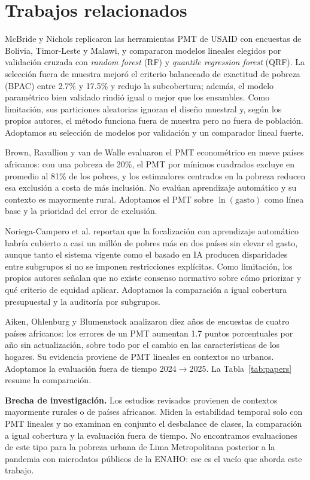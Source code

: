 \section{Trabajos relacionados}

McBride y Nichols \cite{mcbride2018retooling} replicaron las herramientas PMT de USAID con encuestas de Bolivia, Timor-Leste y Malawi, y compararon modelos lineales elegidos por validación cruzada con \textit{random forest} (RF) y \textit{quantile regression forest} (QRF). La selección fuera de muestra mejoró el criterio balanceado de exactitud de pobreza (BPAC) entre 2.7\% y 17.5\% y redujo la subcobertura; además, el modelo paramétrico bien validado rindió igual o mejor que los ensambles. Como limitación, sus particiones aleatorias ignoran el diseño muestral y, según los propios autores, el método funciona fuera de muestra pero no fuera de población. Adoptamos su selección de modelos por validación y un comparador lineal fuerte.

Brown, Ravallion y van de Walle \cite{brown2018poor} evaluaron el PMT econométrico en nueve países africanos: con una pobreza de 20\%, el PMT por mínimos cuadrados excluye en promedio al 81\% de los pobres, y los estimadores centrados en la pobreza reducen esa exclusión a costa de más inclusión. No evalúan aprendizaje automático y su contexto es mayormente rural. Adoptamos el PMT sobre $\ln(\text{gasto})$ como línea base y la prioridad del error de exclusión.

Noriega-Campero et al. \cite{noriega2020algorithmic} reportan que la focalización con aprendizaje automático habría cubierto a casi un millón de pobres más en dos países sin elevar el gasto, aunque tanto el sistema vigente como el basado en IA producen disparidades entre subgrupos si no se imponen restricciones explícitas. Como limitación, los propios autores señalan que no existe consenso normativo sobre cómo priorizar y qué criterio de equidad aplicar. Adoptamos la comparación a igual cobertura presupuestal y la auditoría por subgrupos.

Aiken, Ohlenburg y Blumenstock \cite{aiken2023moving} analizaron diez años de encuestas de cuatro países africanos: los errores de un PMT aumentan 1.7 puntos porcentuales por año sin actualización, sobre todo por el cambio en las características de los hogares. Su evidencia proviene de PMT lineales en contextos no urbanos. Adoptamos la evaluación fuera de tiempo 2024$\rightarrow$2025. La Tabla~\ref{tab:papers} resume la comparación.

\textbf{Brecha de investigación.} Los estudios revisados provienen de contextos mayormente rurales o de países africanos. Miden la estabilidad temporal solo con PMT lineales y no examinan en conjunto el desbalance de clases, la comparación a igual cobertura y la evaluación fuera de tiempo. No encontramos evaluaciones de este tipo para la pobreza urbana de Lima Metropolitana posterior a la pandemia con microdatos públicos de la ENAHO: ese es el vacío que aborda este trabajo.

